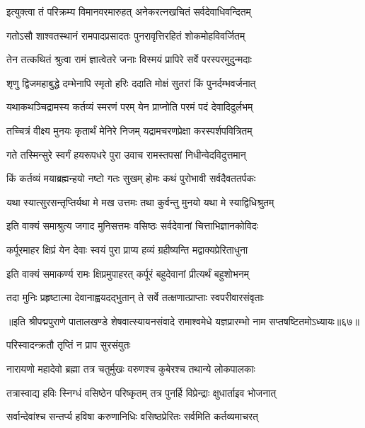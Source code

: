\twolineshloka
{इत्युक्त्वा तं परिक्रम्य विमानवरमारुहत्}
{अनेकरत्नखचितं सर्वदेवाधिवन्दितम्}%

\twolineshloka
{गतोऽसौ शाश्वतस्थानं रामपादप्रसादतः}
{पुनरावृत्तिरहितं शोकमोहविवर्जितम्}%

\twolineshloka
{तेन तत्कथितं श्रुत्वा रामं ज्ञात्वेतरे जनाः}
{विस्मयं प्रापिरे सर्वे परस्परमुदुन्मदाः}%

\twolineshloka
{शृणु द्विजमहाबुद्धे दम्भेनापि स्मृतो हरिः}
{ददाति मोक्षं सुतरां किं पुनर्दम्भवर्जनात्}%

\twolineshloka
{यथाकथञ्चिद्रामस्य कर्तव्यं स्मरणं परम्}
{येन प्राप्नोति परमं पदं देवादिदुर्लभम्}%

\twolineshloka
{तच्चित्रं वीक्ष्य मुनयः कृतार्थं मेनिरे निजम्}
{यद्रामचरणप्रेक्षा करस्पर्शपवित्रितम्}%

\twolineshloka
{गते तस्मिन्सुरे स्वर्गं हयरूपधरे पुरा}
{उवाच रामस्तपसां निधीन्वेदविदुत्तमान्}%

\twolineshloka
{किं कर्तव्यं मयाब्रह्मन्हयो नष्टो गतः सुखम्}
{होमः कथं पुरोभावी सर्वदैवततर्पकः}%

\twolineshloka
{यथा स्यात्सुरसन्तृप्तिर्यथा मे मख उत्तमः}
{तथा कुर्वन्तु मुनयो यथा मे स्याद्विधिश्रुतम्}%

\twolineshloka
{इति वाक्यं समाश्रुत्य जगाद मुनिसत्तमः}
{वसिष्ठः सर्वदेवानां चित्ताभिज्ञानकोविदः}%

\twolineshloka
{कर्पूरमाहर क्षिप्रं येन देवाः स्वयं पुरा}
{प्राप्य हव्यं ग्रहीष्यन्ति मद्वाक्यप्रेरिताधुना}%

\twolineshloka
{इति वाक्यं समाकर्ण्य रामः क्षिप्रमुपाहरत्}
{कर्पूरं बहुदेवानां प्रीत्यर्थं बहुशोभनम्}%

\twolineshloka
{तदा मुनिः प्रहृष्टात्मा देवानाह्वयदद्भुतान्}
{ते सर्वे तत्क्षणात्प्राप्ताः स्वपरीवारसंवृताः}%

॥इति श्रीपद्मपुराणे पातालखण्डे शेषवात्स्यायनसंवादे रामाश्वमेधे यज्ञप्रारम्भो नाम सप्तषष्टितमोऽध्यायः॥६७॥



\onelineshloka
{परिस्वादन्क्रतौ तृप्तिं न प्राप सुरसंयुतः}%

\twolineshloka
{नारायणो महादेवो ब्रह्मा तत्र चतुर्मुखः}
{वरुणश्च कुबेरश्च तथान्ये लोकपालकाः}%

\twolineshloka
{तत्रास्वाद्य हविः स्निग्धं वसिष्ठेन परिष्कृतम्}
{तत्र पुनर्हि विप्रेन्द्राः क्षुधार्ताइव भोजनात्}%

\twolineshloka
{सर्वान्देवांश्च सन्तर्प्य हविषा करुणानिधिः}
{वसिष्ठप्रेरितः सर्वमिति कर्तव्यमाचरत्}%

